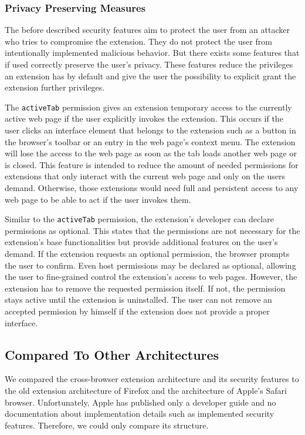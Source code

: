 \subsubsection{Privacy Preserving Measures}

	The before described security features aim to protect the user from an attacker who tries to compromise the extension. They do not protect the user from intentionally implemented malicious behavior. But there exists some features that if used correctly preserve the user's privacy. These features reduce the privileges an extension has by default and give the user the possibility to explicit grant the extension further privileges. 
	
	The \texttt{activeTab} permission gives an extension temporary access to the currently active web page if the user explicitly invokes the extension. This occurs if the user clicks an interface element that belongs to the extension such as a button in the browser's toolbar or an entry in the web page's context menu. The extension will lose the access to the web page as soon as the tab loads another web page or is closed. This feature is intended to reduce the amount of needed permissions for extensions that only interact with the current web page and only on the users demand. Otherwise, those extensions would need full and persistent access to any web page to be able to act if the user invokes them.
	
	Similar to the \texttt{activeTab} permission, the extension's developer can declare permissions as optional. This states that the permissions are not necessary for the extension's base functionalities but provide additional features on the user's demand. If the extension requests an optional permission, the browser prompts the user to confirm. Even host permissions may be declared as optional, allowing the user to fine-grained control the extension's access to web pages. However, the extension has to remove the requested permission itself. If not, the permission stays active until the extension is uninstalled. The user can not remove an accepted permission by himself if the extension does not provide a proper interface. 

\subsection{Compared To Other Architectures}

	We compared the cross-browser extension architecture and its security features to the old extension architecture of Firefox and the architecture of Apple's Safari browser. Unfortunately, Apple has published only a developer guide and no documentation about implementation details such as implemented security features. Therefore, we could only compare its structure.

